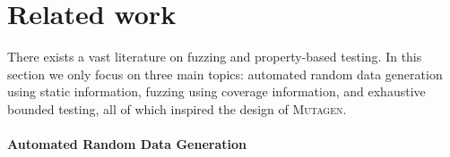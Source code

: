 \documentclass[sigconf, anonymous]{acmart}
\newcommand{\mutagen}{\textsc{Mutagen}\xspace}
\begin{document}






\section{Related work}
\label{sec:related}

There exists a vast literature on fuzzing and property-based testing.
%
In this section we only focus on three main topics:
%
automated random data generation using static information,
%
fuzzing using coverage information, and
%
exhaustive bounded testing, all of which inspired the design of \mutagen.


\paragraph{Automated Random Data Generation}
\end{document}
